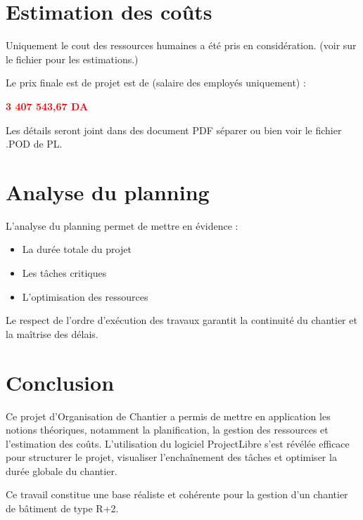 \documentclass[12pt,a4paper]{article}
\begin{document}
	
	\section{Estimation des coûts}
	
	
	Uniquement le cout des ressources humaines a été pris en considération. (voir sur le fichier pour les estimations.)
	
	\vspace{\baselineskip}
	
	Le prix finale est de projet est de (salaire des employés uniquement) : 
	
	{\centering \textbf{\textcolor{red}{3 407 543,67 DA}}\par}
	
	Les détails seront joint dans des document PDF séparer ou bien voir le fichier .POD de PL.
	
	\section{Analyse du planning}
	
	L’analyse du planning permet de mettre en évidence :
	\begin{itemize}
		\item La durée totale du projet
		\item Les tâches critiques
		\item L’optimisation des ressources
	\end{itemize}
	
	Le respect de l’ordre d’exécution des travaux garantit la continuité du chantier
	et la maîtrise des délais.
	
	
	\section{Conclusion}
	
	Ce projet d’Organisation de Chantier a permis de mettre en application les notions théoriques, notamment la planification, la gestion des ressources et l’estimation des coûts. L’utilisation du logiciel ProjectLibre s’est révélée efficace pour structurer le projet, visualiser l’enchaînement des tâches et optimiser la durée globale du chantier.
	
	\vspace{\baselineskip}
	
	Ce travail constitue une base réaliste et cohérente pour la gestion d’un chantier de bâtiment de type R+2.
	
	
	
\end{document}
